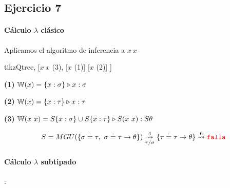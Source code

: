 \documentclass[10pt,a4paper, landscape]{article}
\begin{document}
	\newpage
	\subsection{Ejercicio 7}
	\paragraph{Cálculo $\lambda$ clásico} Aplicamos el algoritmo de inferencia a $x~x$
	
	\vspace*{5mm}
	\setlength{\columnsep}{-5cm}
	\begin{multicols}{2}
		\begin{center}
			\begin{forest} tikzQtree,
				[$x~x$ (3),
				[$x$ (1)]
				[$x$ (2)]
				]
			\end{forest}
			
		\end{center}
		
		\vfill\null
		\columnbreak
		
		\textbf{(1)} $\WFunc(x) = \judgeType{\{x:\sigma\}}{x}{\sigma}$
		
		\textbf{(2)} $\WFunc(x) = \judgeType{\{x:\tau\}}{x}{\tau}$
		
		\textbf{(3)} $\WFunc(x~x) = \judgeType{S\{x:\sigma\}\cup S\{x:\tau\} }{S(x~x)}{S\theta}$
		
		\begin{align*}
		S = MGU(\{\sigma\equalDot\tau,~\sigma\equalDot \tau \to \theta\}) \goesTo{4}{\tau/\sigma}\{\tau\equalDot \tau \to \theta\} \goesTo{6}{} \falla
		\end{align*}
	\end{multicols}
	\setlength{\columnsep}{-1cm}
	
	\paragraph{Cálculo $\lambda$ subtipado}:
	
\end{document}
